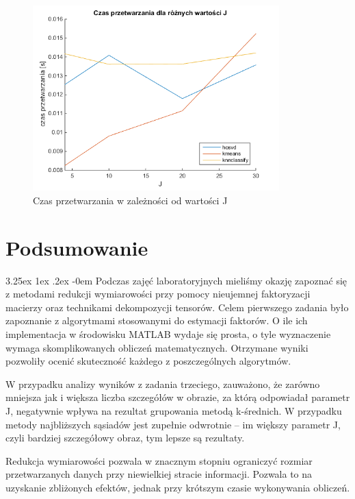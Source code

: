 \documentclass[11pt, a4paper]{article}
\makeatletter
\newcommand{\fbi}{\leavevmode{\parindent=1em\indent}}
\renewcommand\paragraph{\@startsection{paragraph}{5}{\z@}
  {3.25ex \@plus1ex \@minus.2ex}
  {-0em}
  {\normalfont\normalsize\bfseries}}
\makeatother
\begin{document}
\begin{figure}[H]
	\centering
	\includegraphics[width=0.85\textwidth]{./assets/wykres_zad3_czas.png}
	\caption{Czas przetwarzania w zależności od wartości J}
	\label{fig:wykres_zad3_czas}
\end{figure}

\newpage
\section{Podsumowanie}
\paragraph{}
Podczas zajęć laboratoryjnych mieliśmy okazję zapoznać się z metodami redukcji wymiarowości przy pomocy nieujemnej faktoryzacji macierzy oraz technikami dekompozycji tensorów.
Celem pierwszego zadania było zapoznanie z algorytmami stosowanymi do estymacji faktorów. O ile ich implementacja w środowisku MATLAB wydaje się prosta, o tyle wyznaczenie wymaga skomplikowanych obliczeń matematycznych. Otrzymane wyniki pozwoliły ocenić skuteczność każdego z poszczególnych algorytmów.

\fbi
W przypadku analizy wyników z zadania trzeciego, zauważono, że zarówno mniejsza jak i większa liczba szczegółów w obrazie, za którą odpowiadał parametr J, negatywnie wpływa na rezultat grupowania metodą k-średnich. W przypadku metody najbliższych sąsiadów jest zupełnie odwrotnie – im większy parametr J, czyli bardziej szczegółowy obraz, tym lepsze są rezultaty. 

\fbi
Redukcja wymiarowości pozwala w znacznym stopniu ograniczyć rozmiar przetwarzanych danych przy niewielkiej stracie informacji. Pozwala to na uzyskanie zbliżonych efektów, jednak przy krótszym czasie wykonywania obliczeń.
\end{document}

